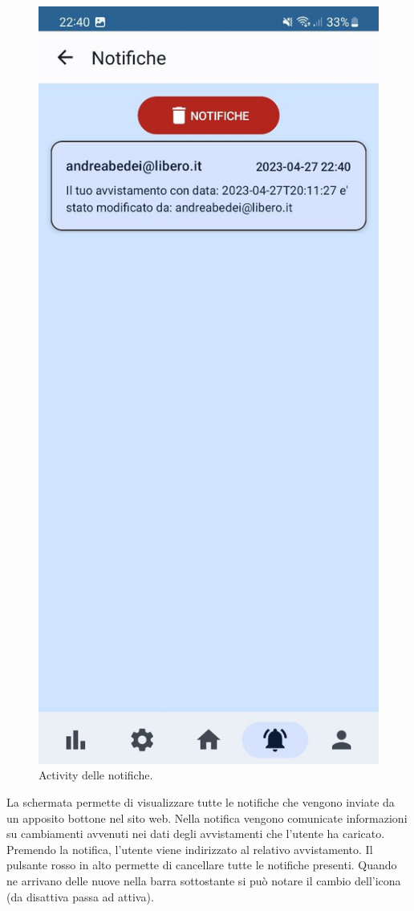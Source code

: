 \documentclass[a4paper,final,12pt]{report}
\begin{document}
\begin{figure}[hbtp]
\centering
\includegraphics[scale=0.20]{img_concettuale/notmob.jpg}
\caption{Activity delle notifiche.}
\end{figure}
La schermata permette di visualizzare tutte le notifiche che vengono inviate da un apposito bottone nel sito web. Nella notifica vengono comunicate informazioni su cambiamenti avvenuti nei dati degli avvistamenti che l'utente ha caricato. Premendo la notifica, l'utente viene indirizzato al relativo avvistamento. Il pulsante rosso in alto permette di cancellare tutte le notifiche presenti. Quando ne arrivano delle nuove nella barra sottostante si può notare il cambio dell'icona (da disattiva passa ad attiva).
\end{document}
